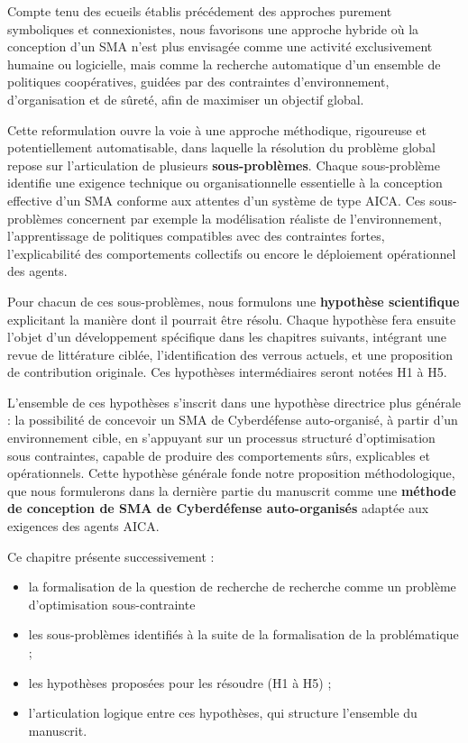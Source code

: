 Compte tenu des ecueils établis précédement des approches purement symboliques et connexionistes, nous favorisons une approche hybride où la conception d'un \ac{SMA} n'est plus envisagée comme une activité exclusivement humaine ou logicielle, mais comme la recherche automatique d'un ensemble de politiques coopératives, guidées par des contraintes d'environnement, d'organisation et de sûreté, afin de maximiser un objectif global.

Cette reformulation ouvre la voie à une approche méthodique, rigoureuse et potentiellement automatisable, dans laquelle la résolution du problème global repose sur l'articulation de plusieurs \textbf{sous-problèmes}. Chaque sous-problème identifie une exigence technique ou organisationnelle essentielle à la conception effective d'un \ac{SMA} conforme aux attentes d'un système de type \ac{AICA}. Ces sous-problèmes concernent par exemple la modélisation réaliste de l'environnement, l'apprentissage de politiques compatibles avec des contraintes fortes, l'explicabilité des comportements collectifs ou encore le déploiement opérationnel des agents.

Pour chacun de ces sous-problèmes, nous formulons une \textbf{hypothèse scientifique} explicitant la manière dont il pourrait être résolu. Chaque hypothèse fera ensuite l'objet d'un développement spécifique dans les chapitres suivants, intégrant une revue de littérature ciblée, l'identification des verrous actuels, et une proposition de contribution originale. Ces hypothèses intermédiaires seront notées H1 à H5.

L'ensemble de ces hypothèses s'inscrit dans une hypothèse directrice plus générale : la possibilité de concevoir un \ac{SMA} de Cyberdéfense auto-organisé, à partir d'un environnement cible, en s'appuyant sur un processus structuré d'optimisation sous contraintes, capable de produire des comportements sûrs, explicables et opérationnels. Cette hypothèse générale fonde notre proposition méthodologique, que nous formulerons dans la dernière partie du manuscrit comme une \textbf{méthode de conception de \ac{SMA} de Cyberdéfense auto-organisés} adaptée aux exigences des agents \ac{AICA}.

Ce chapitre présente successivement :
\begin{itemize}
    \item la formalisation de la question de recherche de recherche comme un problème d'optimisation sous-contrainte
    \item les sous-problèmes identifiés à la suite de la formalisation de la problématique ;
    \item les hypothèses proposées pour les résoudre (H1 à H5) ;
    \item l'articulation logique entre ces hypothèses, qui structure l'ensemble du manuscrit.
\end{itemize}

